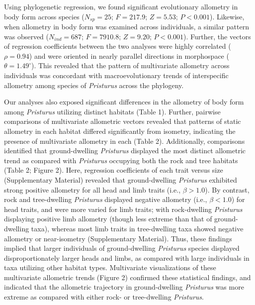\documentclass[
  11pt,
]{article}
\begin{document}
Using phylogenetic regression, we found significant evolutionary
allometry in body form across species (\(N_{sp}=25\); \(F = 217.9\);
\(Z =5.53\); \(P < 0.001\)). Likewise, when allometry in body form was
examined across individuals, a similar pattern was observed
(\(N_{ind}=687\); \(F = 7910.8\); \(Z =9.20\); \(P < 0.001\)). Further,
the vectors of regression coefficients between the two analyses were
highly correlated (\(\rho = 0.94\)) and were oriented in nearly parallel
directions in morphospace (\(\theta = 1.49^\circ\)). This revealed that
the pattern of multivariate allometry across individuals was concordant
with macroevolutionary trends of interspecific allometry among species
of \emph{Pristurus} across the phylogeny. \hfill\break

Our analyses also exposed significant differences in the allometry of
body form among \emph{Pristurus} utilizing distinct habitats (Table 1).
Further, pairwise comparisons of multivariate allometric vectors
revealed that patterns of static allometry in each habitat differed
significantly from isometry, indicating the presence of multivariate
allometry in each (Table 2). Additionally, comparisons identified that
ground-dwelling \emph{Pristurus} displayed the most distinct allometric
trend as compared with \emph{Pristurus} occupying both the rock and tree
habitats (Table 2; Figure 2). Here, regression coefficients of each
trait versus size (Supplementary Material) revealed that ground-dwelling
\emph{Pristurus} exhibited strong positive allometry for all head and
limb traits (i.e., \(\beta>1.0\)). By contrast, rock and tree-dwelling
\emph{Pristurus} displayed negative allometry (i.e., \(\beta < 1.0\))
for head traits, and were more varied for limb traits; with
rock-dwelling \emph{Pristurus} displaying positive limb allometry
(though less extreme than that of ground-dwelling taxa), whereas most
limb traits in tree-dwelling taxa showed negative allometry or
near-isometry (Supplementary Material). Thus, these findings implied
that larger individuals of ground-dwelling \emph{Pristurus} species
displayed disproportionately larger heads and limbs, as compared with
large individuals in taxa utilizing other habitat types. Multivariate
visualizations of these multivariate allometric trends (Figure 2)
confirmed these statistical findings, and indicated that the allometric
trajectory in ground-dwelling \emph{Pristurus} was more extreme as
compared with either rock- or tree-dwelling \emph{Pristurus}.
\hfill\break
\end{document}
